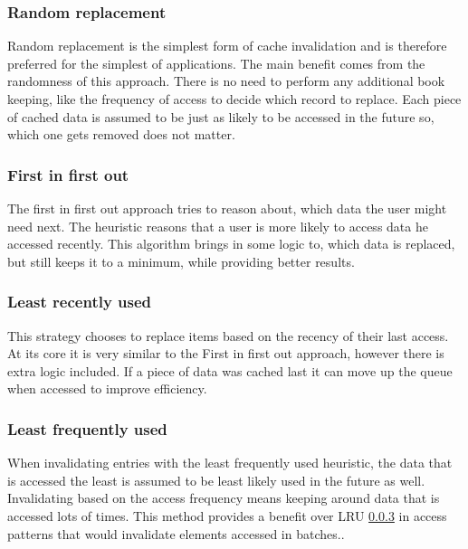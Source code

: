 \documentclass[10pt,twoside,a4paper]{article}
\begin{document}
\subsubsection{Random replacement}
Random replacement is the simplest form of cache invalidation and is therefore preferred for the simplest of applications. The main benefit comes from the randomness of this approach. There is no need to perform any additional book keeping, like the frequency of access to decide which record to replace. Each piece of cached data is assumed to be just as likely to be accessed in the future so, which one gets removed does not matter.

\subsubsection{First in first out}
The first in first out approach tries to reason about, which data the user might need next. The heuristic reasons that a user is more likely to access data he accessed recently. This algorithm brings in some logic to, which data is replaced, but still keeps it to a minimum, while providing better results.

\subsubsection{Least recently used}
\label{sec:lru}
This strategy chooses to replace items based on the recency of their last access. At its core it is very similar to the First in first out approach, however there is extra logic included. If a piece of data was cached last it can move up the queue when accessed to improve efficiency.

\subsubsection{Least frequently used}
When invalidating entries with the least frequently used heuristic, the data that is accessed the least is assumed to be least likely used in the future as well. Invalidating based on the access frequency means keeping around data that is accessed lots of times. This method provides a benefit over LRU \ref{sec:lru} in access patterns that would invalidate elements accessed in batches.\cite{chand2019comparative}\cite{comparison-cache-replacement}.

\end{document}
